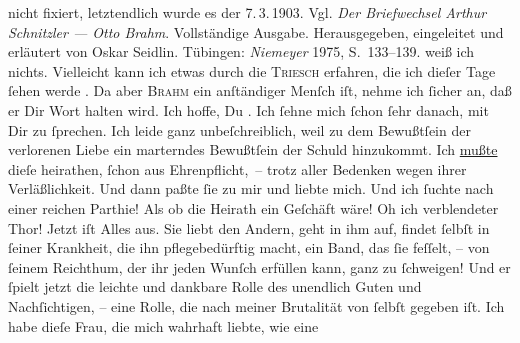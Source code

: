 \begin{ledgroupsized}[t]{13cm}
{{{                  nicht fixiert, letztendlich wurde es der 7. 3. 1903. Vgl. \emph{Der
                        Briefwechsel Arthur Schnitzler — Otto Brahm}. Vollständige Ausgabe.
                     Herausgegeben, eingeleitet und erläutert von Oskar Seidlin.
                     Tübingen: \emph{Niemeyer}{ }1975, S. 133–139.}}}\label{K_L03362-1h} weiß ich nichts. Vielleicht kann ich etwas durch die \textsc{Triesch} erfahren, die ich dieſer Tage ſehen werde . Da aber \textsc{Brahm} ein anſtändiger Menſch iſt,  nehme ich ſicher an, daß er Dir Wort halten wird.\pend
           \pstart
           Ich hoffe, Du \label{K_L03362-2v}\label{K_L03362-2h}. Ich ſehne mich ſchon ſehr danach, mit Dir zu ſprechen. Ich leide {\pb}ganz unbeſchreiblich, weil zu dem Bewußtſein der
               verlorenen Liebe ein marterndes Bewußtſein der Schuld hinzukommt. Ich \uline{mußte} dieſe \label{K_L03362-3v}\label{K_L03362-3h} heirathen, ſchon aus Ehrenpflicht, – trotz aller Bedenken wegen ihrer
               Verläßlichkeit. Und dann paßte ſie zu mir und liebte mich. Und ich ſuchte nach einer
               reichen Parthie! Als ob die Heirath ein Geſchäft wäre! Oh ich verblendeter Thor!
               Jetzt iſt {\pb}Alles aus. Sie liebt den Andern, geht in ihm auf, findet ſelbſt in
               ſeiner Krankheit, die ihn pflegebedürftig macht, ein \strikeout{\textcolor{gray}{w}} Band, das ſie feſſelt, – von ſeinem Reichthum, der ihr jeden Wunſch erfüllen
               kann, ganz zu ſchweigen! Und er ſpielt  jetzt die
               leichte und dankbare Rolle des unendlich Guten und Nachſichtigen, – eine Rolle, die
               nach meiner Brutalität von ſelbſt gegeben iſt. Ich habe dieſe Frau, die mich wahrhaft liebte, wie eine

\end{ledgroupsized}
